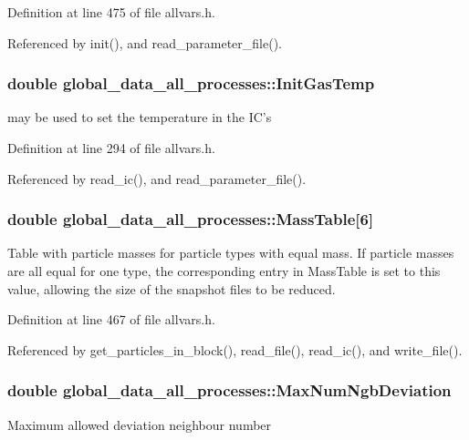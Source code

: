 Definition at line 475 of file allvars.h.



Referenced by init(), and read\_\-parameter\_\-file().

\hypertarget{structglobal__data__all__processes_a633fbd557554f7932dab2641d15e6ea1}{
\subsubsection[{InitGasTemp}]{\setlength{\rightskip}{0pt plus 5cm}double {\bf global\_\-data\_\-all\_\-processes::InitGasTemp}}}
\label{structglobal__data__all__processes_a633fbd557554f7932dab2641d15e6ea1}
may be used to set the temperature in the IC's 

Definition at line 294 of file allvars.h.



Referenced by read\_\-ic(), and read\_\-parameter\_\-file().

\hypertarget{structglobal__data__all__processes_a0d1dbe97a03958559781d9619f8b17c1}{
\subsubsection[{MassTable}]{\setlength{\rightskip}{0pt plus 5cm}double {\bf global\_\-data\_\-all\_\-processes::MassTable}\mbox{[}6\mbox{]}}}
\label{structglobal__data__all__processes_a0d1dbe97a03958559781d9619f8b17c1}
Table with particle masses for particle types with equal mass. If particle masses are all equal for one type, the corresponding entry in MassTable is set to this value, allowing the size of the snapshot files to be reduced. 

Definition at line 467 of file allvars.h.



Referenced by get\_\-particles\_\-in\_\-block(), read\_\-file(), read\_\-ic(), and write\_\-file().

\hypertarget{structglobal__data__all__processes_a388690a6ee1497eea2f19e3984afa088}{
\subsubsection[{MaxNumNgbDeviation}]{\setlength{\rightskip}{0pt plus 5cm}double {\bf global\_\-data\_\-all\_\-processes::MaxNumNgbDeviation}}}
\label{structglobal__data__all__processes_a388690a6ee1497eea2f19e3984afa088}
Maximum allowed deviation neighbour number 

